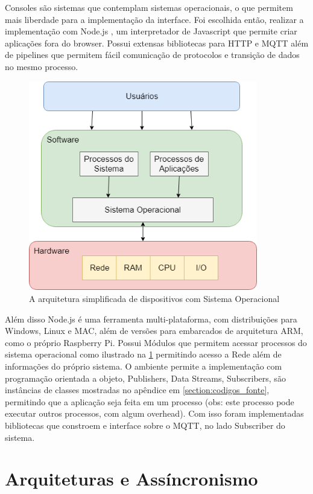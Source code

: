 Consoles são sistemas que contemplam sistemas operacionais, o que permitem mais liberdade para a implementação da interface. Foi escolhida então, realizar a implementação com Node.js , um interpretador de Javascript que permite criar aplicações fora do browser. Possui extensas bibliotecas para HTTP e MQTT além de pipelines que permitem fácil comunicação de protocolos e transição de dados no mesmo processo.


\begin{figure}[h!]
\centering
\includegraphics[width=10cm]{./02_Capitulos/02_Cap3/figures/os-diagram}
\caption{A arquitetura simplificada de dispositivos com Sistema Operacional}
\label{fig:3.3.4/os-diagram}
\end{figure}


Além disso Node.js é uma ferramenta multi-plataforma, com distribuições para Windows, Linux e MAC, além de versões para embarcados de arquitetura ARM, como o próprio Raspberry Pi. Possui Módulos que permitem acessar processos do sistema operacional como ilustrado na \ref{fig:3.3.4/os-diagram} permitindo acesso a Rede além de informações do próprio sistema. O ambiente permite a implementação com programação orientada a objeto, Publishers, Data Streams, Subscribers, são instâncias de classes mostradas no apêndice em \ref{section:codigos_fonte}, permitindo que a aplicação seja feita em um processo (obs: este processo pode executar outros processos, com algum overhead).  Com isso foram implementadas bibliotecas que constroem e interface sobre o MQTT, no lado Subscriber do sistema.

\section{Arquiteturas e Assíncronismo}
\label{section:arquitetura}

